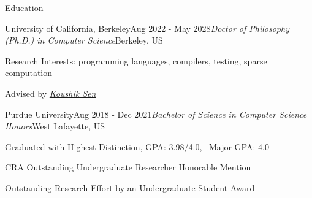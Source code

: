 \documentclass{resume} %
\begin{document}
 

\vspace{-8.0em}
\begin{rSection}{Education}
\begin{rSubsection}{University of California, Berkeley}{Aug 2022 - May 2028}{\textit{Doctor of Philosophy (Ph.D.) in Computer Science}}{Berkeley, US}
    \item Research Interests: programming languages, compilers, testing, sparse computation
    \item Advised by \href{https://people.eecs.berkeley.edu/~ksen/}{\textit{Koushik Sen}}
\end{rSubsection}

\begin{rSubsection}{Purdue University}{Aug 2018 - Dec 2021}{\textit{Bachelor of Science in Computer Science Honors}}{West Lafayette, US}
\item Graduated with Highest Distinction, GPA: 3.98/4.0, \ Major GPA: 4.0
\item CRA Outstanding Undergraduate Researcher Honorable Mention
\item Outstanding Research Effort by an Undergraduate Student Award
\end{rSubsection}

\end{rSection}
\end{document}
